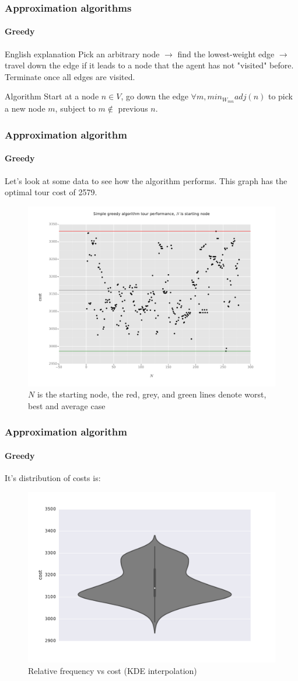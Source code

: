 \documentclass[11pt]{beamer}
\begin{document}
	\begin{frame}
		\frametitle{Approximation algorithms}
		\framesubtitle{Greedy}
		\begin{block}{English explanation}
			Pick an arbitrary node $\rightarrow$ find the lowest-weight edge $\rightarrow$ travel down the edge if it leads to a node that the agent has not "visited" before. Terminate once all edges are visited.
		\end{block}
		\begin{block}{Algorithm}
			Start at a node $n \in V$, go down the edge $\forall m, min_W_{mn} adj(n)$ to pick a new node $m$, subject to $m\notin$ previous $n$.
		\end{block}
	\end{frame}
	\begin{frame}
		\frametitle{Approximation algorithm}
		\framesubtitle{Greedy}
		\centering
		Let's look at some data to see how the algorithm performs. This graph has the optimal tour cost of 2579. \begin{figure}
			\centering
			\includegraphics[width=0.7\linewidth]{"img/Simple greedy approach, small graph/scatter_vis"}
			\caption{$N$ is the starting node, the red, grey, and green lines denote worst, best and average case}
		\end{figure}
	\end{frame}
	\begin{frame}
		\frametitle{Approximation algorithm}
		\framesubtitle{Greedy}
		\centering
		It's distribution of costs is:
		\begin{figure}
			\centering
			\includegraphics[width=0.7\linewidth]{"img/Simple greedy approach, small graph/dist_across_cost"}
			\caption{Relative frequency vs cost (KDE interpolation)}
		\end{figure}
	\end{frame}
\end{document}
